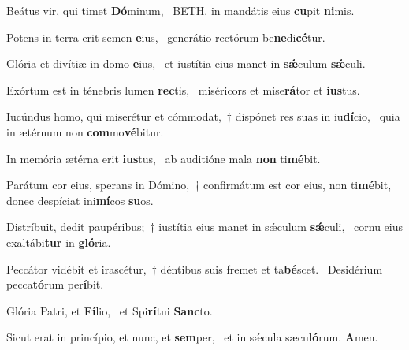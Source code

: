 \item Beátus vir, qui timet \textbf{Dó}minum,~\psstar{} BETH. in mandátis eius \textbf{cu}pit \textbf{ni}mis.

\item Potens in terra erit semen \textbf{e}ius,~\psstar{} generátio rectórum be\textbf{ne}di\textbf{cé}tur.

\item Glória et divítiæ in domo \textbf{e}ius,~\psstar{} et iustítia eius manet in \textbf{sǽ}culum \textbf{sǽ}culi.

\item Exórtum est in ténebris lumen \textbf{rec}tis,~\psstar{} miséricors et mise\textbf{rá}tor et \textbf{ius}tus.

\item Iucúndus homo, qui miserétur et cómmodat,~† dispónet res suas in iu\textbf{dí}cio,~\psstar{} quia in ætérnum non \textbf{com}mo\textbf{vé}bitur.

\item In memória ætérna erit \textbf{ius}tus,~\psstar{} ab auditióne mala \textbf{non} ti\textbf{mé}bit.

\item Parátum cor eius, sperans in Dómino,~† confirmátum est cor eius, non ti\textbf{mé}bit,~\psstar{} donec despíciat ini\textbf{mí}cos \textbf{su}os.

\item Distríbuit, dedit paupéribus;~† iustítia eius manet in sǽculum \textbf{sǽ}culi,~\psstar{} cornu eius exaltábi\textbf{tur} in \textbf{gló}ria.

\item Peccátor vidébit et irascétur,~† déntibus suis fremet et ta\textbf{bé}scet.~\psstar{} Desidérium pecca\textbf{tó}rum per\textbf{í}bit.

\item Glória Patri, et \textbf{Fí}lio,~\psstar{} et Spi\textbf{rí}tui \textbf{Sanc}to.

\item Sicut erat in princípio, et nunc, et \textbf{sem}per,~\psstar{} et in sǽcula sæcu\textbf{ló}rum. \textbf{A}men.